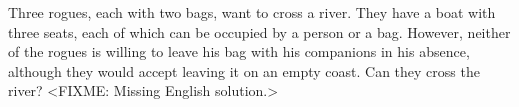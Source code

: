 \problem{}
Three rogues, each with two bags, want to cross a river.
They have a boat with three seats, each of which can be occupied by a person or
a bag.
However, neither of the rogues is willing to leave his bag with his companions
in his absence, although they would accept leaving it on an empty coast.
Can they cross the river?
\solution
<FIXME: Missing English solution.>
\endproblem
